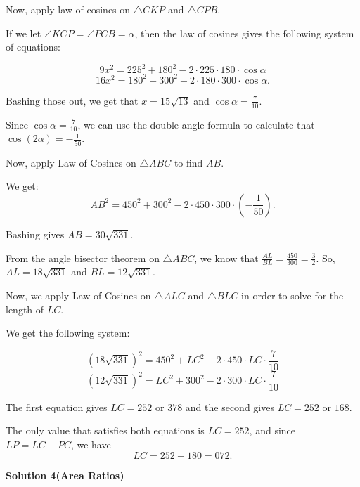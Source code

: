\begin{enumerate}
 Now, apply law of cosines on $\triangle CKP$ and $\triangle CPB.$

 If we let $\angle KCP = \angle PCB = \alpha$, then the law of cosines gives the following system of equations: 

 
 \[9x^2 = 225^2 + 180^2 - 2\cdot 225 \cdot 180 \cdot \cos \alpha\]
 \[16x^2 = 180^2 + 300^2 - 2 \cdot 180 \cdot 300 \cdot \cos \alpha.\]

 Bashing those out, we get that $x = 15 \sqrt{13}$ and $\cos \alpha = \frac{7}{10}.$

 Since $\cos \alpha = \frac{7}{10}$, we can use the double angle formula to calculate that $\cos \left(2 \alpha \right) = -\frac{1}{50}.$

 Now, apply Law of Cosines on $\triangle ABC$ to find $AB$. 

 We get: 
 \[AB^2 = 450^2 + 300^2 - 2 \cdot 450 \cdot 300 \cdot \left(- \frac{1}{50} \right).\]

 Bashing gives $AB = 30 \sqrt{331}.$

 From the angle bisector theorem on $\triangle ABC$, we know that $\frac{AL}{BL} = \frac{450}{300} = \frac{3}{2}.$ So, $AL = 18 \sqrt{331}$ and $BL = 12 \sqrt{331}.$

 Now, we apply Law of Cosines on $\triangle ALC$ and $\triangle BLC$ in order to solve for the length of $LC$. 

 We get the following system: 

 
 \[(18 \sqrt{331})^2 = 450^2 + LC^2 - 2 \cdot 450 \cdot LC \cdot \frac{7}{10}\]
 \[(12 \sqrt{331})^2 = LC^2 + 300^2 - 2 \cdot 300 \cdot LC \cdot \frac{7}{10}\]

 The first equation gives $LC = 252$ or $378$ and the second gives $LC = 252$ or $168$.

 The only value that satisfies both equations is $LC = 252$, and since $LP = LC - PC$, we have 
 \[LC = 252 - 180 = \boxed{072}.\]




\textbf{Solution 4(Area Ratios)}


\end{enumerate}
